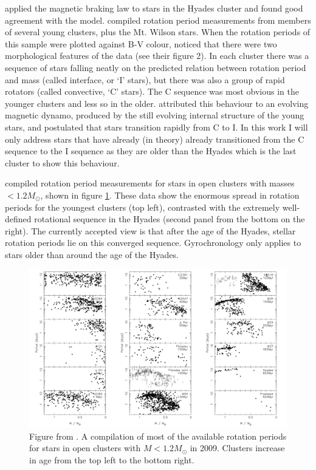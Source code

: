 \citet{Kawaler1989} applied the \citet{Kawaler1988} magnetic braking law to
stars in the Hyades cluster and found good agreement with the model.
\citet{Barnes2003} compiled rotation period measurements from members of
several young clusters, plus the Mt. Wilson stars.
When the rotation periods of this sample were plotted against B-V colour,
\citet{Barnes2003} noticed that there were two morphological features of the
data (see their figure 2).
In each cluster there was a sequence of stars falling neatly on the predicted
relation between rotation period and mass (called interface, or `I' stars),
but there was also a group of rapid rotators (called convective, `C' stars).
The C sequence was most obvious in the younger clusters and less so in the
older.
\citet{Barnes2003} attributed this behaviour to an evolving magnetic dynamo,
produced by the still evolving internal structure of the young stars, and
postulated that stars transition rapidly from C to I.
In this work I will only address stars that have already (in theory) already
transitioned from the C sequence to the I sequence as they are older than the
Hyades which is the last cluster to show this behaviour.

\citet{Irwin2009} compiled rotation period measurements for stars in open
clusters with masses $< 1.2 M_\odot$, shown in figure \ref{fig:irwin}.
These data show the enormous spread in rotation periods for the youngest
clusters (top left), contrasted with the extremely well-defined rotational
sequence in the Hyades (second panel from the bottom on the right).
The currently accepted view is that after the age of the Hyades, stellar
rotation periods lie on this converged sequence.
Gyrochronology only applies to stars older than around the age of the Hyades.
\begin{figure}[p]
\begin{center}
\includegraphics[width=6in, clip=true]{figures/irwin.pdf}
\caption[Cluster rotation from \citet{Irwin2009}]
{Figure from \citet{Irwin2009}. A compilation of most of the available
rotation periods for stars in open clusters with $M < 1.2 M_\odot$ in 2009.
Clusters increase in age from the top left to the bottom right.}
\label{fig:irwin}
\end{center}
\end{figure}


